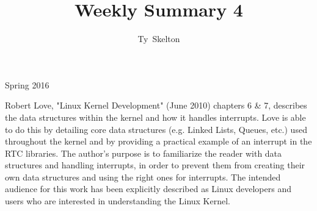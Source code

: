 \documentclass[10pt,draftclsnofoot,onecolumn]{IEEEtran}
\begin{document}
\singlespacing
\title{Weekly Summary 4}

\author{Ty~Skelton}

{Spring 2016}

\maketitle
\IEEEpeerreviewmaketitle

Robert Love, "Linux Kernel Development" (June 2010) chapters 6 \& 7, describes the data structures within the kernel and how it handles interrupts.
Love is able to do this by detailing core data structures (e.g. Linked Lists, Queues, etc.) used throughout the kernel and by providing a practical example of an interrupt in the RTC libraries.
The author's purpose is to familiarize the reader with data structures and handling interrupts, in order to prevent them from creating their own data structures and using the right ones for interrupts.  
The intended audience for this work has been explicitly described as Linux developers and users who are interested in understanding the Linux Kernel.
\end{document}

